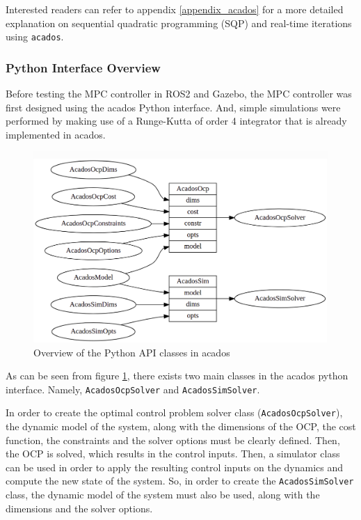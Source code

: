 \documentclass{thesisreport}
\begin{document}
Interested readers can refer to appendix \ref{appendix_acados} for a more detailed explanation on sequential quadratic programming (SQP) and real-time iterations using \texttt{acados}.

\newpage
 
\subsubsection{Python Interface Overview}
 
 Before testing the MPC controller in ROS2 and Gazebo, the MPC controller was first designed using the acados Python interface. And, simple simulations were performed by making use of a Runge-Kutta of order 4 integrator that is already implemented in acados. 
 
 
 \begin{figure}[h]
 	\centering
 	\includegraphics[width=\textwidth]{Images/acados/python_interface.png}
 	\caption{Overview of the Python API classes in acados \cite{Verschueren2018}}
 	\label{fig:python_interface}
 \end{figure}
 
 As can be seen from figure \ref{fig:python_interface}, there exists two main classes in the acados python interface. Namely, \texttt{AcadosOcpSolver} and \texttt{AcadosSimSolver}. 
 
 In order to create the optimal control problem solver class (\texttt{AcadosOcpSolver}), the dynamic model of the system, along with the dimensions of the OCP, the cost function, the constraints and the solver options must be clearly defined. Then, the OCP is solved, which results in the control inputs.
 Then, a simulator class can be used in order to apply the resulting control inputs on the dynamics and compute the new state of the system. So, in order to create the \texttt{AcadosSimSolver} class, the dynamic model of the system must also be used, along with the dimensions and the solver options.
 
\end{document}
